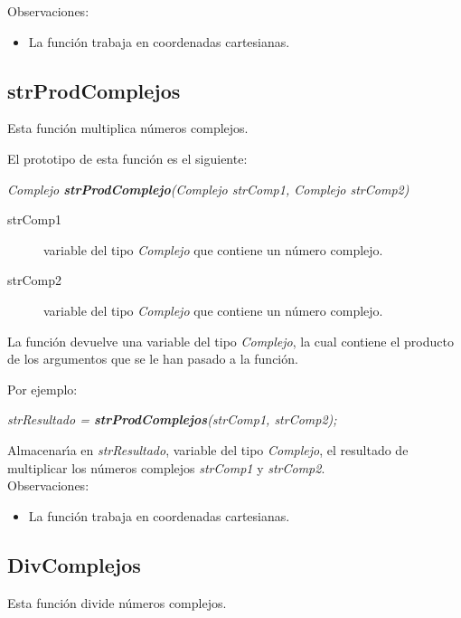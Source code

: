 Observaciones:

\begin{itemize}
\item La funci\'on trabaja en coordenadas cartesianas.
\end{itemize}

\subsection{strProdComplejos}
Esta funci\'on multiplica n\'umeros complejos.\newline

El prototipo de esta funci\'on es el siguiente:

\begin{center}
\emph{Complejo \textbf{strProdComplejo}(Complejo strComp1, Complejo strComp2)}
\end{center}

\begin{description}
\item[strComp1] variable del tipo \emph{Complejo} que contiene un n\'umero 
complejo.
\item[strComp2] variable del tipo \emph{Complejo} que contiene un n\'umero
complejo.
\end{description}

La funci\'on devuelve una variable del tipo \emph{Complejo}, la cual contiene
el producto de los argumentos que se le han pasado a la funci\'on.\newline

Por ejemplo:

\begin{center}
\emph{strResultado = \textbf{strProdComplejos}(strComp1, strComp2);}
\end{center}

Almacenar\'{\i}a en \emph{strResultado}, variable del tipo \emph{Complejo}, el
resultado de multiplicar los n\'umeros complejos \emph{strComp1} y \emph{strComp2}.\\

Observaciones:

\begin{itemize}
\item La funci\'on trabaja en coordenadas cartesianas.
\end{itemize}

\subsection{DivComplejos}
Esta funci\'on divide n\'umeros complejos.\newline

